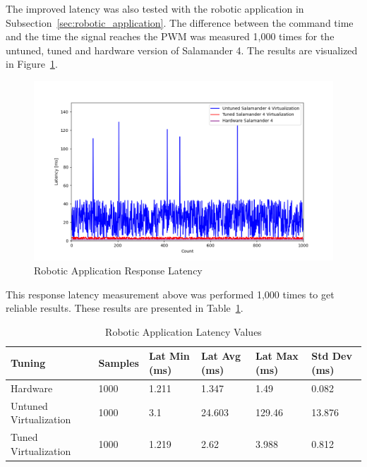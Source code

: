 \documentclass[MMR,Master,english]{twbook}
\begin{document}
\clearpage 

\noindent The improved latency was also tested with the robotic application in Subsection~\ref{sec:robotic_application}. The difference between the command time and the time the signal reaches the PWM was measured 1,000 times for the untuned, tuned and hardware version of Salamander 4. The results are visualized in Figure~\ref{fig:combined_latencies}. 

\begin{figure}[H]
	\centering
	\includegraphics[width=1.0\columnwidth]{masterthesis-documentation/docs/resources/scripts/experiment/generated_latencies/combined_latencies.png}
	\caption[Robotic Application Response Latency]{Robotic Application Response Latency}
	\label{fig:combined_latencies}
\end{figure}

\noindent This response latency measurement above was performed 1,000 times to get reliable results. These results are presented in Table~\ref{tab:robotic_application_latency_values_combined}.

\begin{table}[H]
	\small
	\centering
	\caption{Robotic Application Latency Values}
	\label{tab:robotic_application_latency_values_combined}
	\setlength{\tabcolsep}{0.5em} %
	{\renewcommand{\arraystretch}{1.2}%
		\begin{tabular}{|l|l|l|l|l|l|}
			\hline
			\textbf{Tuning} & \textbf{Samples} & \textbf{Lat Min (ms)} & \textbf{Lat Avg (ms)} & \textbf{Lat Max (ms)} & \textbf{Std Dev (ms)} \\ \hline
			Hardware & 1000 & 1.211 & 1.347 & 1.49 & 0.082 \\ \hline
			Untuned Virtualization & 1000 & 3.1 & 24.603 & 129.46 & 13.876 \\ \hline
			Tuned Virtualization & 1000 & 1.219 & 2.62 & 3.988 & 0.812 \\ \hline
		\end{tabular}}
\end{table}
\end{document}

